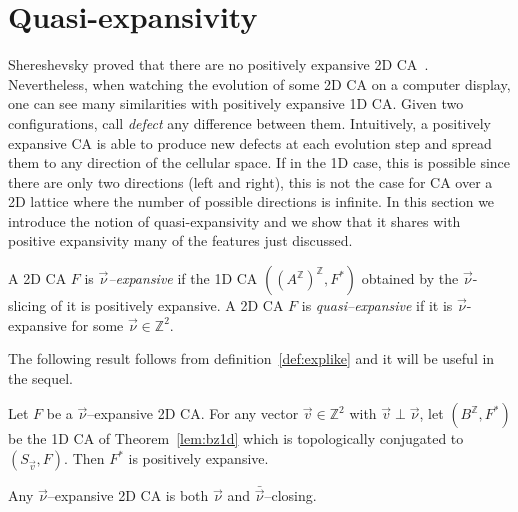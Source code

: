\documentclass{llncs}
\newcommand{\z}{\ensuremath{\mathbb{Z}}\xspace}
\newcommand{\sv}{S_{\vec v}}
\newcommand{\az}{\ensuremath{A^{\mathbb{Z}}}\xspace}
\newcommand{\zdu}{\ensuremath{\mathbb{Z}^2}\xspace}
\newcommand{\para}[1]{(#1)}
\newcommand{\nn}{\vec\nu}
\newcommand{\vv}{\vec v}
\begin{document}
\section{Quasi-expansivity}
Shereshevsky proved that there are no positively expansive 2D CA~\cite{shereshevsky93}. Nevertheless, when watching the evolution of some 2D CA on a computer display, one can see many similarities with positively expansive 1D CA. Given two configurations, call \emph{defect}
any difference between them. Intuitively, a positively expansive CA is able to produce new defects at each evolution step and spread them to any direction of the cellular space. If in the 1D case, this is possible since there are only two directions (left and right), this is not
the case for CA over a 2D lattice where the number of possible directions is infinite.  In this section we introduce the notion of quasi-expansivity and we show that it shares with positive expansivity many
of the features just discussed.
\begin{definition}
\label{def:explike} A 2D CA $F$ is \emph{$\nn$--expansive} if the
1D CA $\para{(\az)^{\z},F^*}$ obtained by the $\nn$-slicing of it
is positively expansive. A 2D CA $F$ is \emph{quasi--expansive} if
it is $\nn$-expansive for some $\nn\in\zdu$.
\end{definition}
The following result follows from definition~\ref{def:explike} and
it will be useful in the sequel.
\begin{lemma}
\label{lem:nuexpansivef} Let $F$ be a $\nn$--expansive 2D CA. For
any vector $\vv\in\zdu$ with $\vv\perp\nn$, let $\para{B^{\z},
F^*}$ be the 1D CA of Theorem~\ref{lem:bz1d} which is
topologically conjugated to $\para{\sv, F}$.
Then $F^*$ is positively expansive.
\end{lemma}
\begin{theorem}
\label{th:expclosing} Any $\nn$--expansive 2D CA is both $\nn$ and
$\bar{\nn}$--closing.
\end{theorem}
\end{document}

